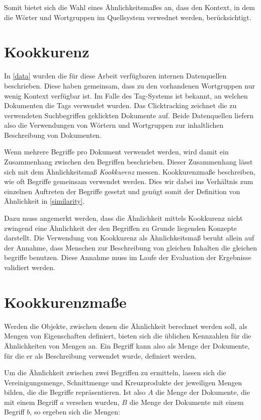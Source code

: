 Somit bietet sich die Wahl eines Ähnlichkeitsmaßes an, dass den Kontext, in dem die Wörter und Wortgruppen im Quellsystem verwednet werden, berücksichtigt.

\section{Kookkurenz}

In \ref{data} wurden die für diese Arbeit verfügbaren internen Datenquellen beschrieben. Diese haben gemeinsam, dass zu den vorhandenen Wortgruppen nur wenig Kontext verfügbar ist. Im Falle des Tag-Systems ist bekannt, an welchen Dokumenten die Tags verwendet wurden. Das Clicktracking zeichnet die zu verwendeten Suchbegriffen geklickten Dokumente auf. Beide Datenquellen liefern also die Verwendungen von Wörtern und Wortgruppen zur inhaltlichen Beschreibung von Dokumenten.

Wenn mehrere Begriffe pro Dokument verwendet werden, wird damit ein Zusammenhang zwischen den Begriffen beschrieben. Dieser Zusammenhang lässt sich mit dem Ähnlichkeitsmaß \emph{Kookkurenz} messen. Kookkurenzmaße beschreiben, wie oft Begriffe gemeinsam verwendet werden. Dies wir dabei ins Verhältnis zum einzelnen Auftreten der Begriffe gesetzt und genügt somit der Definition von Ähnlichkeit in \ref{similarity}.

Dazu muss angemerkt werden, dass die Ähnlichkeit mittels Kookkurenz nicht zwingend eine Ähnlichkeit der den Begriffen zu Grunde liegenden Konzepte darstellt. Die Verwendung von Kookkurenz als Ähnlichkeitsmaß beruht allein auf der Annahme, dass Menschen zur Beschreibung von gleichen Inhalten die gleichen begriffe benutzen. Diese Annahme muss im Laufe der Evaluation der Ergebnisse validiert werden.

\section{Kookkurenzmaße}
\label{measures}

Werden die Objekte, zwischen denen die Ähnlichkeit berechnet werden soll, als Mengen von Eigenschaften definiert, bieten sich die üblichen Kennzahlen für die Ähnlichkeiten von Mengen an. Ein Begriff kann also als Menge der Dokumente, für die er als Beschreibung verwendet wurde, definiert werden.

Um die Ähnlichkeit zwischen zwei Begriffen zu ermitteln, lassen sich die Vereinigungsmenge, Schnittmenge und Kreuzprodukte der jeweiligen Mengen bilden, die die Begriffe repräsentieren. Ist also \(A\) die Menge der Dokumente, die mit einem Begriff \(a\) versehen wurden, \(B\) die Menge der Dokumente mit einem Begriff \(b\), so ergeben sich die Mengen:

